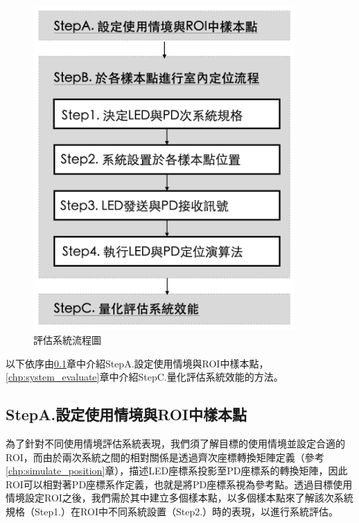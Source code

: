 \begin{figure}[htpb]
    \centering
    \includegraphics[width=10cm]{ch4pic/evaluate_flow.png}
    \caption{評估系統流程圖}
    \label{pic:evaluate_flow}
\end{figure}


以下依序由\ref{chp:scenario}章中介紹StepA.設定使用情境與ROI中樣本點，\ref{chp:system_evaluate}章中介紹StepC.量化評估系統效能的方法。







\subsection{StepA.設定使用情境與ROI中樣本點}
\label{chp:scenario}




為了針對不同使用情境評估系統表現，我們須了解目標的使用情境並設定合適的ROI，而由於兩次系統之間的相對關係是透過齊次座標轉換矩陣定義（參考\ref{chp:simulate_position}章），描述LED座標系投影至PD座標系的轉換矩陣，因此ROI可以相對著PD座標系作定義，也就是將PD座標系視為參考點。透過目標使用情境設定ROI之後，我們需於其中建立多個樣本點，以多個樣本點來了解該次系統規格（Step1.）在ROI中不同系統設置（Step2.）時的表現，以進行系統評估。

